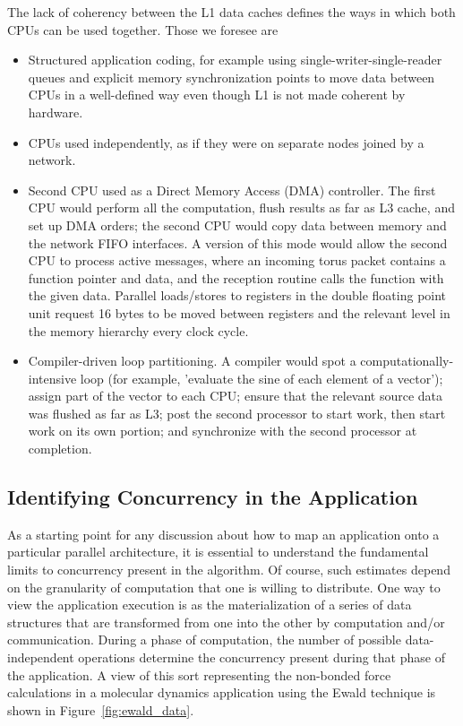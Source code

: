 \documentclass[doublespacing]{elsart}
\begin{document}
The lack of coherency between the L1 data caches defines the ways in
which both CPUs can be used together. Those we foresee are
\begin{itemize}
\item Structured application coding, for example using
single-writer-single-reader queues and explicit memory synchronization
points to move data between CPUs in a well-defined way even though L1
is not made coherent by hardware.
\item CPUs used independently, as if they were on separate nodes
joined by a network.
\item Second CPU used as a Direct Memory Access (DMA)
controller. The first CPU would perform all the computation, flush
results as far as L3 cache, and set up DMA orders; the second CPU
would copy data between memory and the network FIFO interfaces. A
version of this mode would allow the second CPU to process active
messages, where an incoming torus packet contains a function pointer
and data, and the reception routine calls the function with the given
data. Parallel loads/stores to registers in the double floating point
unit request 16 bytes to be moved between registers and the relevant
level in the memory hierarchy every clock cycle.
\item Compiler-driven loop partitioning. A compiler would spot a
computationally-intensive loop (for example, 'evaluate the sine of
each element of a vector'); assign part of the vector to each CPU;
ensure that the relevant source data was flushed as far as L3; post
the second processor to start work, then start work on its own
portion; and synchronize with the second processor at completion.
\end{itemize}

\subsection{Identifying Concurrency in the Application\label{sect:concurrency}}

As a starting point for any discussion about how to map an application
onto a particular parallel architecture, it is essential to understand
the fundamental limits to concurrency present in the algorithm. Of
course, such estimates depend on the granularity of computation that
one is willing to distribute. One way to view the application
execution is as the materialization of a series of data structures
that are transformed from one into the other by computation and/or
communication. During a phase of computation, the number of possible
data-independent operations determine the concurrency present during
that phase of the application.  A view of this sort representing the
non-bonded force calculations in a molecular dynamics application
using the Ewald technique is shown in Figure~\ref{fig:ewald_data}.
\end{document}
